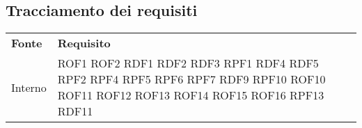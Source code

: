 \subsection{Tracciamento dei requisiti}
\begin{longtable}{| p{5cm} | p{5cm} |}
		\rowcolor{LightBlue}
		\color{white}\bfseries Fonte & \color{white}\bfseries Requisito \\[0.25cm]
		Interno & 	ROF1 \newline
					ROF2 \newline
					RDF1 \newline
					RDF2 \newline
					RDF3 \newline
					RPF1 \newline
					RDF4 \newline
					RDF5 \newline
					RPF2 \newline
					RPF4 \newline
					RPF5 \newline
					RPF6 \newline
					RPF7 \newline
					RDF9 \newline
					RPF10 \newline
					ROF10 \newline
					ROF11 \newline
					ROF12 \newline
					ROF13 \newline
					ROF14 \newline
					ROF15 \newline
					ROF16 \newline
					RPF13 \newline
					RDF11 \\
					

\end{longtable}
